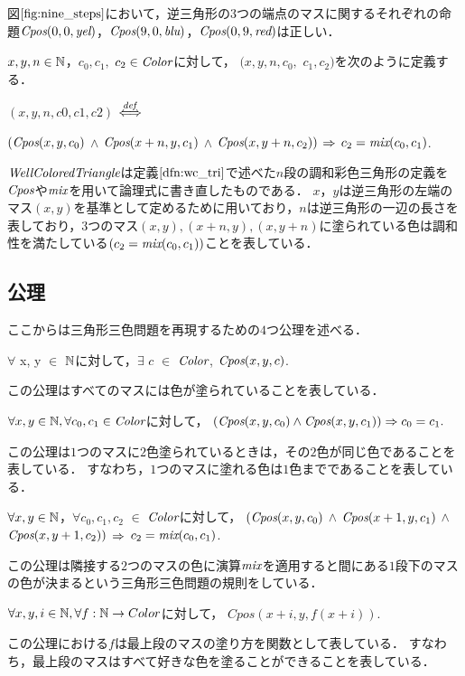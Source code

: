 \begin{exm}
  図$\ref{fig:nine_steps}$において，逆三角形の$3$つの端点のマスに関するそれぞれの命題$\textit{Cpos}(0,0,\textit{yel})$，$\textit{Cpos}(9,0,\textit{blu})$，$\textit{Cpos}(0,9,\textit{red})$は正しい．
\end{exm}
\begin{dfn}[$\WCT$]
  $x, y, n \in \mathbb{N}$，$c_0, c_1,$ $c_2 \in \textit{Color}$に対して，
  \WCT$(x, y, n, c_0,$ $c_1, c_2)$を次のように定義する．
  
  \WCT$(x, y, n, c0, c1, c2)$ $\overset{{\it def}}{\Longleftrightarrow}$
  
  $(\textit{Cpos}(x,y,c_0)$ $\land$ $\textit{Cpos}(x+n,y,c_1)$ $\land$ $\textit{Cpos}(x,y+n,c_2))$ $\Rightarrow$ $c_2 = \textit{mix}(c_0,c_1)$.
  
  $\WCT$は定義$\ref{dfn:wc_tri}$で述べた$n$段の調和彩色三角形の定義を$\textit{Cpos}$や$\textit{mix}$を用いて論理式に書き直したものである．
  $x$，$y$は逆三角形の左端のマス$(x,y)$を基準として定めるために用いており，$n$は逆三角形の一辺の長さを表しており，$3$つのマス$(x,y), (x+n,y), (x,y+n)$に塗られている色は調和性を満たしている$(c_2=\textit{mix}(c_0,c_1))$ことを表している．
\end{dfn}

\subsection{公理}
ここからは三角形三色問題を再現するための$4$つ公理を述べる．
\begin{axm}[$\Cexists$] \label{axm:exists}
  $\forall$ x, y $\in$ $\mathbb{N}$に対して，$\exists$ $c$ $\in$ $\textit{Color}$, $\textit{Cpos}(x,y,c)$.
  
  この公理はすべてのマスには色が塗られていることを表している．
\end{axm}
\begin{axm}[$\Cuniq$] \label{axm:uniq}
  $\forall x, y \in \mathbb{N}, \forall c_0, c_1 \in \textit{Color}$に対して，
  $(\textit{Cpos}(x,y,c_0) \land \textit{Cpos}(x,y,c_1)) \Rightarrow c_0 = c_1.$
  
  この公理は$1$つのマスに$2$色塗られているときは，その$2$色が同じ色であることを表している．
  すなわち，$1$つのマスに塗れる色は$1$色までであることを表している．
\end{axm}
\begin{axm}[$\Cmix$] \label{axm:mix}
  $\forall x, y \in \mathbb{N}$，$\forall c_0, c_1, c_2$ $\in$ $\textit{Color}$に対して，
  $(\textit{Cpos}(x,y,c_0)$ $\land$ $\textit{Cpos}(x+1,y,c_1)$ $\land$ $\textit{Cpos}(x,y+1,c_2))$ $\Rightarrow$ $c_2 = \textit{mix}(c_0,c_1)$.
  
  この公理は隣接する$2$つのマスの色に演算$\textit{mix}$を適用すると間にある$1$段下のマスの色が決まるという三角形三色問題の規則をしている．
\end{axm}
\begin{axm}[$C\_paint$] \label{axm:paint}
  $\forall x, y, i \in \mathbb{N}, \forall f:\mathbb{N} \to Color$に対して，
  $Cpos(x+i,y,f(x+i))$.
  
  この公理における$f$は最上段のマスの塗り方を関数として表している．
  すなわち，最上段のマスはすべて好きな色を塗ることができることを表している．
\end{axm}

